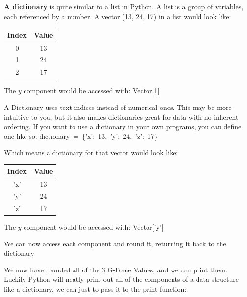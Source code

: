 	\ifprint\else
	\begin{aside}
		\textbf{A dictionary} is quite similar to a list in Python. A list is a group of variables, each referenced by a number. A vector (13, 24, 17) in a list would look like:
		
		\color{Black}
		\begin{tabular}{|c|c|}
			\hline Index & Value \\ 
			\hline 0 & 13 \\ 
			\hline 1 & 24 \\ 
			\hline 2 & 17 \\ 
			\hline 
		\end{tabular} 
		\color{JungleGreen}
		
		The $y$ component would be accessed with: \mbox{Vector[1]}
		
		A Dictionary uses text indices instead of numerical ones. This may be more intuitive to you, but it also makes dictionaries great for data with no inherent ordering. If you want to use a dictionary in your own programs, you can define one like so:
		\mbox{dictionary = \{'x': 13, 'y': 24, 'z': 17\}}
		
		Which means a dictionary for that vector would look like:
		
		\color{Black}
		\begin{tabular}{|c|c|}
			\hline Index & Value \\ 
			\hline 'x' & 13 \\ 
			\hline 'y' & 24 \\ 
			\hline 'z' & 17 \\ 
			\hline 
		\end{tabular}
		\color{JungleGreen}
		
		The $y$ component would be accessed with: \mbox{Vector['y']}	
	\end{aside}
	\fi
	
	We can now access each component and round it, returning it back to the dictionary
	
	
	
	We now have rounded all of the 3 G-Force Values, and we can print them.
	Luckily Python will neatly print out all of the components of a data structure like a dictionary, we can just to pass it to the print function:
	
	
